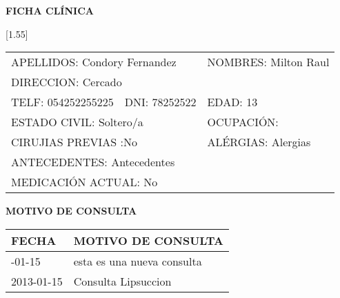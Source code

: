 \documentclass[10pt,a4paper]{article}
\begin{document}
\begin{center}
\LARGE{\textbf{FICHA CL\'INICA}}
\end{center}
\scalebox{1.40}[1.55]{
\begin{tabular}{p{2.8cm}p{2.8cm}p{6.5cm}}
\multicolumn{2}{p{6cm}}{\scriptsize{APELLIDOS: Condory Fernandez}} & \scriptsize{NOMBRES: Milton Raul} \\
\multicolumn{3}{p{13cm}}{\scriptsize{DIRECCION: Cercado}} \\
\scriptsize{TELF: 054252255225} & \scriptsize{DNI: 78252522} & \scriptsize{EDAD: 13} \\
\multicolumn{2}{p{6cm}}{\scriptsize{ESTADO CIVIL: Soltero/a}} & \scriptsize{OCUPACI\'ON: } \\
\multicolumn{2}{p{6 cm}}{\scriptsize{CIRUJIAS PREVIAS :No}} & \scriptsize{AL\'ERGIAS: Alergias} \\
\multicolumn{3}{p{13 cm}}{\scriptsize{ANTECEDENTES: Antecedentes}} \\
\multicolumn{3}{p{13 cm}}{\scriptsize{MEDICACI\'ON ACTUAL: No}} \\
\end{tabular}}
\vspace{0.3cm}
\begin{center}
\LARGE{\textbf{MOTIVO DE CONSULTA}}
\end{center}
\begin{center}
\begin{longtable}{ p{2cm}| p{14.5cm}}
\hline
\endfirsthead
\textbf{FECHA} & \textbf{MOTIVO DE CONSULTA}\\\hline
\endhead
\endfoot
\endlastfoot
2013-01-15&esta es una nueva consulta		\\
\hline
2013-01-15&Consulta Lipsuccion	
\\
\hline
\end{longtable}
\end{center}
\end{document}
